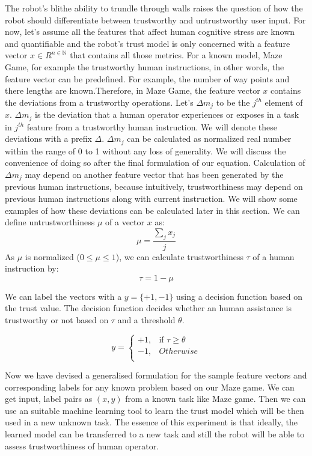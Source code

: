 \documentclass{sig-alternate}
\begin{document}
The robot's blithe ability to trundle through walls raises the
question of how the robot should differentiate between trustworthy and untrustworthy user input. For now, let's assume all the features that affect human cognitive stress are known and quantifiable and the robot's trust model is only concerned with a feature vector $ x \in R^{n \in \mathbb{N}} $ that contains all those metrics. For a known model, Maze Game, for example the trustworthy human instructions, in other words, the feature vector can be predefined. For example, the number of way points and there lengths are known.Therefore, in Maze Game, the feature vector $x$ contains the deviations from a trustworthy operations. Let's $\Delta m_j$ to be the $ j^{th} $ element of $x$. $\Delta m_j$ is the deviation that a human operator experiences or exposes in a task in $ j^{th} $ feature from a trustworthy human instruction. We will denote these deviations with a prefix $\Delta$. $\Delta m_j$ can be calculated as normalized real number within the range of 0 to 1 without any loss of generality. We will discuss the convenience of doing so after the final formulation of our equation. Calculation of $\Delta m_j$ may depend on another feature vector that has been generated by the previous human instructions, because intuitively, trustworthiness may depend on previous human instructions along with current instruction. We will show some examples of how these deviations can be calculated later in this section. We can define untrustworthiness $\mu $ of a vector $x$ as:
\begin{equation}
  \label{eq:general_untrust}
  \mu=\dfrac{\sum_{j} x_j}{j}
\end{equation}
As $\mu$ is normalized ($0\leq \mu \leq 1$), we can calculate trustworthiness $\tau$ of a human instruction by:
\begin{equation}
  \label{eq:general_trust}
  \tau=1 - \mu
\end{equation}

We can label the vectors with a $y = \{+1, -1\}$ using a decision function based on the trust value. The decision function decides whether an human assistance is trustworthy or not based on $\tau$ and a threshold $\theta$.

\[
y = 
\begin{cases}
+1, & \text{if } \tau\ge \theta\\
-1, & Otherwise\\
\end{cases}
\]

Now we have devised a generalised formulation for the sample feature vectors and corresponding labels for any known problem based on our Maze game. We can get input, label pairs as $(x, y)$ from a known task like Maze game. Then we can use an suitable machine learning tool to learn the trust model which will be then used in a new unknown  task. The essence of this experiment is that ideally, the learned model can be transferred to a new task and still the robot will be able to assess trustworthiness of human operator.
  
\end{document}

